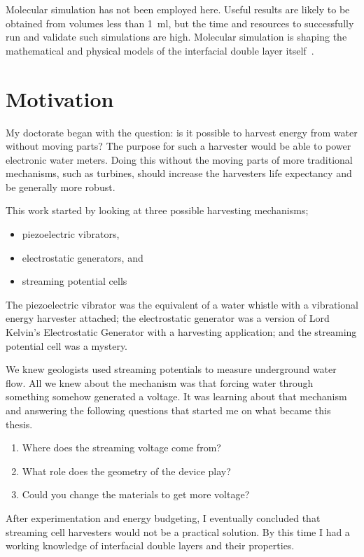     Molecular simulation has not been employed here.
    Useful results are likely to be obtained from volumes less than \SI{1}{\milli\litre}, but the time and resources to successfully run and validate such simulations are high.
    Molecular simulation is shaping the mathematical and physical models of the interfacial double layer itself~\cite{Kornyshev2007}.


\section{Motivation}
  My doctorate began with the question: is it possible to harvest energy from water without moving parts?
  The purpose for such a harvester would be able to power electronic water meters.
  Doing this without the moving parts of more traditional mechanisms, such as turbines, should increase the harvesters life expectancy and be generally more robust.

  This work started by looking at three possible harvesting mechanisms;
  \begin{itemize}
    \item piezoelectric vibrators,
    \item electrostatic generators, and
    \item streaming potential cells
  \end{itemize}

  The piezoelectric vibrator was the equivalent of a water whistle with a vibrational energy harvester attached; the electrostatic generator was a version of Lord Kelvin's Electrostatic Generator with a harvesting application; and the streaming potential cell was a mystery.

  We knew geologists used streaming potentials to measure underground water flow.
  All we knew about the mechanism was that forcing water through something somehow generated a voltage.
  It was learning about that mechanism and answering the following questions that started me on what became this thesis.
  \begin{enumerate}
    \item Where does the streaming voltage come from?
    \item What role does the geometry of the device play?
    \item Could you change the materials to get more voltage?
  \end{enumerate}
  After experimentation and energy budgeting, I eventually concluded that streaming cell harvesters would not be a practical solution.
  By this time I had a working knowledge of interfacial double layers and their properties.

